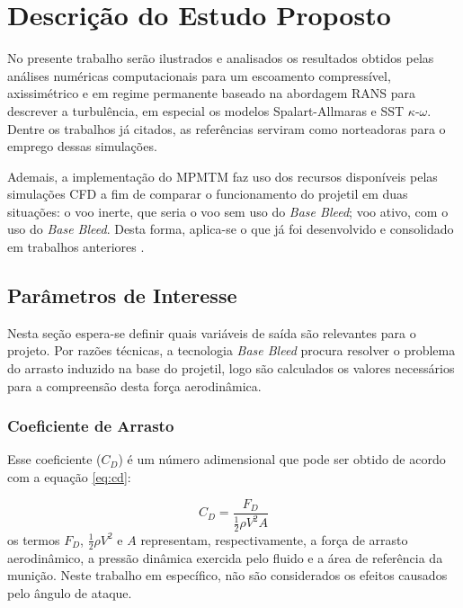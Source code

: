 \chapter{Descrição do Estudo Proposto}\label{cap:estudo-proposto}
\graphicspath{{chapter-06/img-cap06/}}

No presente trabalho serão ilustrados e analisados os resultados obtidos pelas análises numéricas computacionais para um escoamento compressível, axissimétrico e em regime permanente baseado na abordagem RANS para descrever a turbulência, em especial os modelos Spalart-Allmaras e SST $\kappa$-$\omega$. Dentre os trabalhos já citados, as referências \cite{Dali2018a,Sahu1985,Mahmoud2009,torangatti2basawaraj,belaidouni2016,nicolas-perez_accuracy_2017,Lucena2020,Reddy2021} serviram como norteadoras para o emprego dessas simulações. 

Ademais, a implementação do MPMTM faz uso dos recursos disponíveis pelas simulações CFD a fim de comparar o funcionamento do projetil em duas situações: o voo inerte, que seria o voo sem uso do \textit{Base Bleed}; voo ativo, com o uso do \textit{Base Bleed}. Desta forma, aplica-se o que já foi desenvolvido e consolidado em trabalhos anteriores \cite{Rosendo2020,Gauchoux1991,balon2006analysis,Abou-Elela2013,Skande2014,Lim2016}.

\section{Parâmetros de Interesse}

Nesta seção espera-se definir quais variáveis de saída são relevantes para o projeto. Por razões técnicas, a tecnologia \textit{Base Bleed} procura resolver o problema do arrasto induzido na base do projetil, logo são calculados os valores necessários para a compreensão desta força aerodinâmica. 

\subsection{Coeficiente de Arrasto}

Esse coeficiente ($C_D$) é um número adimensional que pode ser obtido de acordo com a equação \ref{eq:cd}:

\begin{equation} \label{eq:cd}
    C_{D} = \frac{F_{D}}{\frac{1}{2}\rho V^2 A}
\end{equation}
%
os termos $F_{D}$, $\frac{1}{2}\rho V^2$ e $A$ representam, respectivamente, a força de arrasto aerodinâmico, a pressão dinâmica exercida pelo fluido e a área de referência da munição. Neste trabalho em específico, não são considerados os efeitos causados pelo ângulo de ataque.

